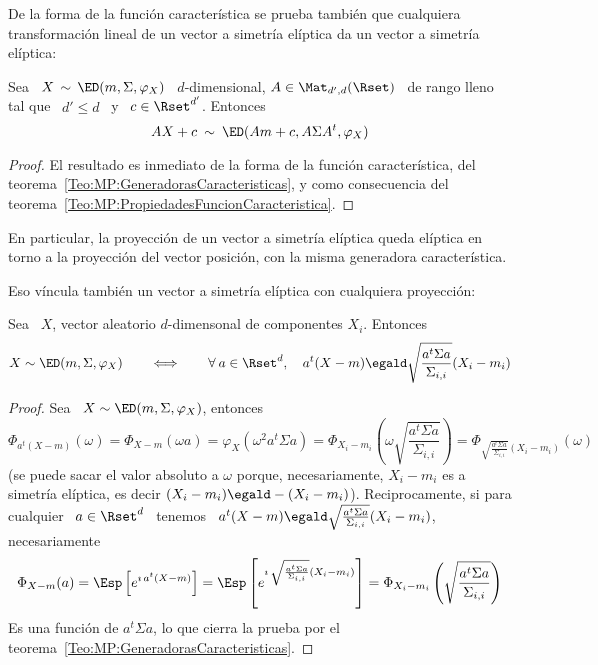 De la  forma de la funci\'on  caracter\'istica se prueba  tambi\'en que cualquiera
transformaci\'on  lineal de un  vector a  simetr\'ia el\'iptica  da un  vector a
simetr\'ia el\'iptica:
%
\begin{teorema}
\label{Teo:MP:TranformacionAfinEliptica}
%
  Sea  \  $X \,  \sim  \,  \ED(m,\Sigma,\varphi_X)$  \ $d$-dimensional,  $A  \in
  \Mat_{d',d}(\Rset)$  \ de  rango lleno  tal que  \ $d'  \le d$  \ y  \  $c \in
  \Rset^{d'}$. Entonces
  \[
  A X + c \: \sim \: \ED(A m + c , A \Sigma A^t , \varphi_X)
  \]
\end{teorema}
%
\begin{proof}
  El resultado  es inmediato de la  forma de la  funci\'on caracter\'istica, del
  teorema~\ref{Teo:MP:GeneradorasCaracteristicas},   y  como   consecuencia  del
  teorema~\ref{Teo:MP:PropiedadesFuncionCaracteristica}.
\end{proof}
%
En  particular, la  proyecci\'on  de  un vector  a  simetr\'ia el\'iptica  queda
el\'iptica  en torno  a  la proyecci\'on  del  vector posici\'on,  con la  misma
generadora caracter\'istica.


Eso  v\'incula  tambi\'en  un  vector  a  simetr\'ia  el\'iptica  con  cualquiera
proyecci\'on:
%
\begin{teorema}
\label{Teo:MP:ProyeccionComponentesEliptica}
%
  Sea \ $X$, vector aleatorio $d$-dimensonal de componentes $X_i$. Entonces
  \[
  X \sim \ED(m,\Sigma,\varphi_X) \qquad  \Longleftrightarrow \qquad \forall \: a
  \in \Rset^d, \quad a^t (X - m) \egald \sqrt{\frac{a^t \Sigma a}{\Sigma_{i,i}}}
  (X_i - m_i)
  \]
\end{teorema}
%
\begin{proof}
  Sea \ $X \sim \ED(m,\Sigma,\varphi_X)$, entonces
  \[
  \Phi_{a^t (X - m)}(\omega) = \Phi_{X - m}(\omega a) = \varphi_X\left( \omega^2
    a^t \Sigma  a \right)  = \Phi_{X_i-m_i}\left( \omega  \sqrt{\frac{a^t \Sigma
        a}{\Sigma_{i,i}}}\right)       =       \Phi_{\sqrt{\frac{a^t      \Sigma
        a}{\Sigma_{i,i}}} (X_i-m_i)}\left( \omega \right)
  \]
  (se puede sacar el valor absoluto a $\omega$ porque, necesariamente, $X_i-m_i$
  es     a    simetr\'ia    el\'iptica,     es    decir     $(X_i-m_i)    \egald
  -(X_i-m_i)$). Reciprocamente, si para cualquier  \ $a \in \Rset^d$ \ tenemos \
  $a^t (X  - m)  \egald \sqrt{\frac{a^t \Sigma  a}{\Sigma_{i,i}}} (X_i  - m_i)$,
  necesariamente
  \[
  \Phi_{X  - m}(a) =  \Esp\left[ e^{\imath  \, a^t  (X-m)} \right]  = \Esp\left[
    e^{\imath \, \sqrt{\frac{a^t \Sigma a}{\Sigma_{i,i}}} (X_i - m_i)} \right] =
  \Phi_{X_i-m_i}\left( \sqrt{\frac{a^t \Sigma a}{\Sigma_{i,i}}}\right)
  \]
  Es  una  funci\'on  de  $a^t  \Sigma  a$,  lo que  cierra  la  prueba  por  el
  teorema~\ref{Teo:MP:GeneradorasCaracteristicas}.
\end{proof}

